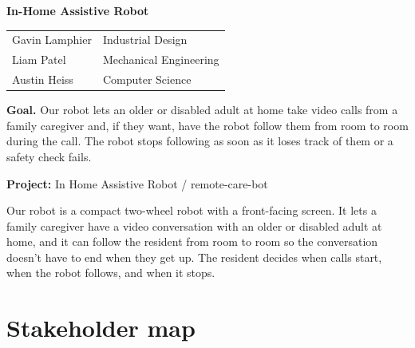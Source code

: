 \documentclass[12pt,letterpaper]{article}
\begin{document}
\begin{titlepage}\centering\vspace*{1.2in}
{\LARGE\bfseries In-Home Assistive Robot\par}
\vspace{0.25in}{\Large User Stories and Use Cases\par}
\vspace{0.8in}
\begin{tabular}{ll}
Gavin Lamphier & Industrial Design\\[6pt]
Liam Patel & Mechanical Engineering\\[6pt]
Austin Heiss & Computer Science\\[6pt]
\end{tabular}
\vfill
\begin{minipage}{0.84\textwidth}\textbf{Goal.} Our robot lets an older or disabled adult at home take video calls from a family caregiver and, if they want, have the robot follow them from room to room during the call. The robot stops following as soon as it loses track of them or a safety check fails.\end{minipage}
\par\vspace{0.16in}{\small AI assisted with LaTeX formatting.\par}
\vspace*{0.6in}
\end{titlepage}


\textbf{Project:} In Home Assistive Robot / remote-care-bot

Our robot is a compact two-wheel robot with a front-facing screen. It lets a family caregiver have a video conversation with an older or disabled adult at home, and it can follow the resident from room to room so the conversation doesn't have to end when they get up. The resident decides when calls start, when the robot follows, and when it stops.

\section{Stakeholder map}

\begingroup\small
\end{document}

